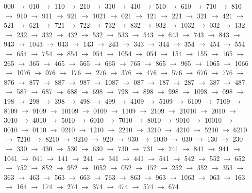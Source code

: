 000 $\rightarrow$ 010 $\rightarrow$ 110 $\rightarrow$ 210 $\rightarrow$ 310 $\rightarrow$ 410 $\rightarrow$ 510 $\rightarrow$ 610 $\rightarrow$ 710 $\rightarrow$ 810 $\rightarrow$ 910 $\rightarrow$ 911 $\rightarrow$ 921 $\rightarrow$ 1021 $\rightarrow$ 021 $\rightarrow$ 121 $\rightarrow$ 221 $\rightarrow$ 321 $\rightarrow$ 421 $\rightarrow$ 521 $\rightarrow$ 621 $\rightarrow$ 721 $\rightarrow$ 722 $\rightarrow$ 732 $\rightarrow$ 832 $\rightarrow$ 932 $\rightarrow$ 1032 $\rightarrow$ 032 $\rightarrow$ 132 $\rightarrow$ 232 $\rightarrow$ 332 $\rightarrow$ 432 $\rightarrow$ 532 $\rightarrow$ 533 $\rightarrow$ 543 $\rightarrow$ 643 $\rightarrow$ 743 $\rightarrow$ 843 $\rightarrow$ 943 $\rightarrow$ 1043 $\rightarrow$ 043 $\rightarrow$ 143 $\rightarrow$ 243 $\rightarrow$ 343 $\rightarrow$ 344 $\rightarrow$ 354 $\rightarrow$ 454 $\rightarrow$ 554 $\rightarrow$ 654 $\rightarrow$ 754 $\rightarrow$ 854 $\rightarrow$ 954 $\rightarrow$ 1054 $\rightarrow$ 054 $\rightarrow$ 154 $\rightarrow$ 155 $\rightarrow$ 165 $\rightarrow$ 265 $\rightarrow$ 365 $\rightarrow$ 465 $\rightarrow$ 565 $\rightarrow$ 665 $\rightarrow$ 765 $\rightarrow$ 865 $\rightarrow$ 965 $\rightarrow$ 1065 $\rightarrow$ 1066 $\rightarrow$ 1076 $\rightarrow$ 076 $\rightarrow$ 176 $\rightarrow$ 276 $\rightarrow$ 376 $\rightarrow$ 476 $\rightarrow$ 576 $\rightarrow$ 676 $\rightarrow$ 776 $\rightarrow$ 876 $\rightarrow$ 877 $\rightarrow$ 887 $\rightarrow$ 987 $\rightarrow$ 1087 $\rightarrow$ 087 $\rightarrow$ 187 $\rightarrow$ 287 $\rightarrow$ 387 $\rightarrow$ 487 $\rightarrow$ 587 $\rightarrow$ 687 $\rightarrow$ 688 $\rightarrow$ 698 $\rightarrow$ 798 $\rightarrow$ 898 $\rightarrow$ 998 $\rightarrow$ 1098 $\rightarrow$ 098 $\rightarrow$ 198 $\rightarrow$ 298 $\rightarrow$ 398 $\rightarrow$ 498 $\rightarrow$ 499 $\rightarrow$ 4109 $\rightarrow$ 5109 $\rightarrow$ 6109 $\rightarrow$ 7109 $\rightarrow$ 8109 $\rightarrow$ 9109 $\rightarrow$ 10109 $\rightarrow$ 0109 $\rightarrow$ 1109 $\rightarrow$ 2109 $\rightarrow$ 21010 $\rightarrow$ 2010 $\rightarrow$ 3010 $\rightarrow$ 4010 $\rightarrow$ 5010 $\rightarrow$ 6010 $\rightarrow$ 7010 $\rightarrow$ 8010 $\rightarrow$ 9010 $\rightarrow$ 10010 $\rightarrow$ 0010 $\rightarrow$ 0110 $\rightarrow$ 0210 $\rightarrow$ 1210 $\rightarrow$ 2210 $\rightarrow$ 3210 $\rightarrow$ 4210 $\rightarrow$ 5210 $\rightarrow$ 6210 $\rightarrow$ 7210 $\rightarrow$ 8210 $\rightarrow$ 9210 $\rightarrow$ 920 $\rightarrow$ 930 $\rightarrow$ 1030 $\rightarrow$ 030 $\rightarrow$ 130 $\rightarrow$ 230 $\rightarrow$ 330 $\rightarrow$ 430 $\rightarrow$ 530 $\rightarrow$ 630 $\rightarrow$ 730 $\rightarrow$ 731 $\rightarrow$ 741 $\rightarrow$ 841 $\rightarrow$ 941 $\rightarrow$ 1041 $\rightarrow$ 041 $\rightarrow$ 141 $\rightarrow$ 241 $\rightarrow$ 341 $\rightarrow$ 441 $\rightarrow$ 541 $\rightarrow$ 542 $\rightarrow$ 552 $\rightarrow$ 652 $\rightarrow$ 752 $\rightarrow$ 852 $\rightarrow$ 952 $\rightarrow$ 1052 $\rightarrow$ 052 $\rightarrow$ 152 $\rightarrow$ 252 $\rightarrow$ 352 $\rightarrow$ 353 $\rightarrow$ 363 $\rightarrow$ 463 $\rightarrow$ 563 $\rightarrow$ 663 $\rightarrow$ 763 $\rightarrow$ 863 $\rightarrow$ 963 $\rightarrow$ 1063 $\rightarrow$ 063 $\rightarrow$ 163 $\rightarrow$ 164 $\rightarrow$ 174 $\rightarrow$ 274 $\rightarrow$ 374 $\rightarrow$ 474 $\rightarrow$ 574 $\rightarrow$ 674 